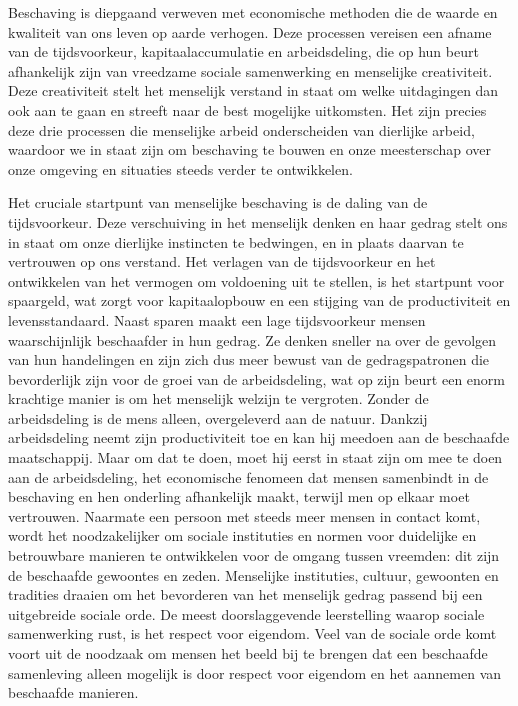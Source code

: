 \documentclass[
  a5paper,
  smalldemyvopaper,11pt,twoside,onecolumn,openright,extrafontsizes,
hidelinks]{memoir}
\begin{document}
Beschaving is diepgaand verweven met economische methoden die de waarde
en kwaliteit van ons leven op aarde verhogen. Deze processen vereisen
een afname van de tijdsvoorkeur, kapitaalaccumulatie en arbeidsdeling,
die op hun beurt afhankelijk zijn van vreedzame sociale samenwerking en
menselijke creativiteit. Deze creativiteit stelt het menselijk verstand
in staat om welke uitdagingen dan ook aan te gaan en streeft naar de
best mogelijke uitkomsten. Het zijn precies deze drie processen die
menselijke arbeid onderscheiden van dierlijke arbeid, waardoor we in
staat zijn om beschaving te bouwen en onze meesterschap over onze
omgeving en situaties steeds verder te ontwikkelen.

Het cruciale startpunt van menselijke beschaving is de daling van de
tijdsvoorkeur. Deze verschuiving in het menselijk denken en haar gedrag
stelt ons in staat om onze dierlijke instincten te bedwingen, en in
plaats daarvan te vertrouwen op ons verstand. Het verlagen van de
tijdsvoorkeur en het ontwikkelen van het vermogen om voldoening uit te
stellen, is het startpunt voor spaargeld, wat zorgt voor kapitaalopbouw
en een stijging van de productiviteit en levensstandaard. Naast sparen
maakt een lage tijdsvoorkeur mensen waarschijnlijk beschaafder in hun
gedrag. Ze denken sneller na over de gevolgen van hun handelingen en
zijn zich dus meer bewust van de gedragspatronen die bevorderlijk zijn
voor de groei van de arbeidsdeling, wat op zijn beurt een enorm
krachtige manier is om het menselijk welzijn te vergroten. Zonder de
arbeidsdeling is de mens alleen, overgeleverd aan de natuur. Dankzij
arbeidsdeling neemt zijn productiviteit toe en kan hij meedoen aan de
beschaafde maatschappij. Maar om dat te doen, moet hij eerst in staat
zijn om mee te doen aan de arbeidsdeling, het economische fenomeen dat
mensen samenbindt in de beschaving en hen onderling afhankelijk maakt,
terwijl men op elkaar moet vertrouwen. Naarmate een persoon met steeds
meer mensen in contact komt, wordt het noodzakelijker om sociale
instituties en normen voor duidelijke en betrouwbare manieren te
ontwikkelen voor de omgang tussen vreemden: dit zijn de beschaafde
gewoontes en zeden. Menselijke instituties, cultuur, gewoonten en
tradities draaien om het bevorderen van het menselijk gedrag passend bij
een uitgebreide sociale orde. De meest doorslaggevende leerstelling
waarop sociale samenwerking rust, is het respect voor eigendom. Veel van
de sociale orde komt voort uit de noodzaak om mensen het beeld bij te
brengen dat een beschaafde samenleving alleen mogelijk is door respect
voor eigendom en het aannemen van beschaafde manieren.
\end{document}
